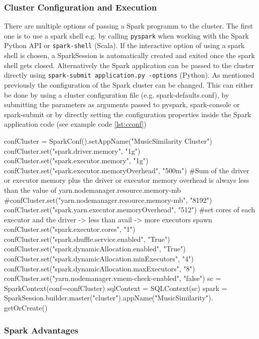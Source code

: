 \subsubsection{Cluster Configuration and Execution}\label{cconfexp}


There are multiple options of passing a Spark programm to the cluster. The first one is to use a spark shell e.g. by calling \lstinline{pyspark} when working with the Spark Python API or \lstinline{spark-shell} (Scala). If the interactive option of using a spark shell is chosen, a SparkSession is automatically created and exited once the spark shell gets closed. 
Alternatively the Spark application can be passed to the cluster directly using \lstinline{spark-submit application.py -options} (Python).
As mentioned previously the configuration of the Spark cluster can be changed. This can either be done by using a cluster configuration file (e.g. spark-defaults.conf), by submitting the parameters as arguments passed to pyspark, spark-console or spark-submit or by directly setting the configuration properties inside the Spark application code (see example code \ref{lst:cconf})\\


\begin{pythonCode}[frame=single,label={lst:cconf},caption={example cluster configuration python},captionpos=b]
confCluster = SparkConf().setAppName("MusicSimilarity Cluster")
confCluster.set("spark.driver.memory", "1g")
confCluster.set("spark.executor.memory", "1g")
confCluster.set("spark.executor.memoryOverhead", "500m")
#Sum of the driver or executor memory plus the driver or executor memory overhead is always less than the value of yarn.nodemanager.resource.memory-mb
#confCluster.set("yarn.nodemanager.resource.memory-mb", "8192")
confCluster.set("spark.yarn.executor.memoryOverhead", "512")
#set cores of each executor and the driver -> less than avail -> more executors spawn
confCluster.set("spark.executor.cores", "1")
confCluster.set("spark.shuffle.service.enabled", "True")
confCluster.set("spark.dynamicAllocation.enabled", "True")
confCluster.set("spark.dynamicAllocation.minExecutors", "4")
confCluster.set("spark.dynamicAllocation.maxExecutors", "8")
confCluster.set("yarn.nodemanager.vmem-check-enabled", "false")
sc = SparkContext(conf=confCluster)
sqlContext = SQLContext(sc)
spark = SparkSession.builder.master("cluster").appName("MusicSimilarity").
	getOrCreate()
\end{pythonCode}

\subsubsection{Spark Advantages}


